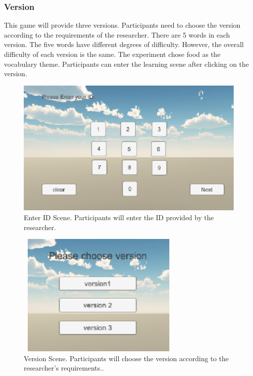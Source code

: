 \documentclass{vgtc}                          %
\begin{document}
\subsubsection{Version}
This game will provide three versions. Participants need to choose the version according to the requirements of the researcher. There are 5 words in each version. The five words have different degrees of difficulty. However, the overall difficulty of each version is the same. The experiment chose food as the vocabulary theme. Participants can enter the learning scene after clicking on the version.

\begin{figure}[H]
 \centering 
 \includegraphics[width=\columnwidth]{pictures/Enter ID.png}
 \caption{Enter ID Scene. Participants will enter the ID provided by the researcher.}
 \label{fig:enterid}
\end{figure}

\begin{figure}[H]
 \centering %
 \includegraphics[width=8cm, height=6cm]{pictures/Version.png}
 \caption{Version Scene. Participants will choose the version according to the researcher's requirements..}
   \label{fig:verion}
\end{figure}
\end{document}
